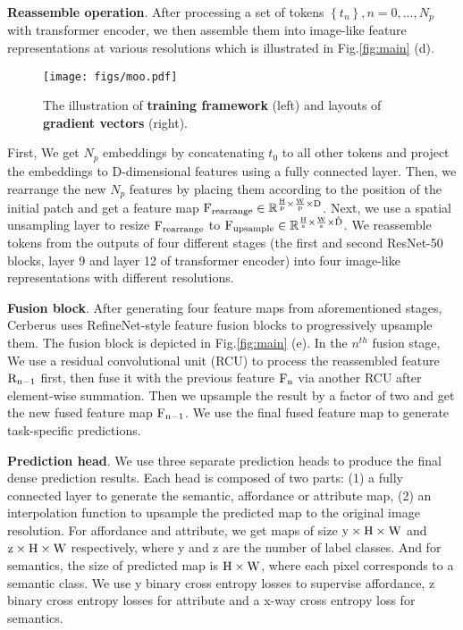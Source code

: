 \documentclass[10pt,twocolumn,letterpaper]{article}
\begin{document}
\textbf{Reassemble operation}. After processing a set of tokens $\left\{t_n\right\}, n=0,...,N_p$  with transformer encoder, we then assemble them into image-like feature representations at various resolutions which is illustrated in Fig.\ref{fig:main} (d). 

\begin{figure*}[t]
	\centering
	\texttt{[image: figs/moo.pdf]}
	\caption{The illustration of \textbf{training framework} (left) and layouts of \textbf{gradient vectors} (right). }
	\label{fig:moo} 
\end{figure*}

First, We get $N_p$ embeddings by concatenating $t_0$ to all other tokens and project the embeddings to D-dimensional features using a fully connected layer. Then, we rearrange the new $ N_p$ features by placing them according to the position of the initial patch and get a feature map $\rm F_{rearrange} \in \mathbb{R}^{\frac{H}{p} \times \frac{W}{p} \times D}$. Next, we use a spatial unsampling layer to resize $\rm F_{rearrange}$ to $\rm F_{upsample} \in \mathbb{R}^{\frac{H}{s} \times \frac{W}{s} \times \hat{D}}$. We reassemble tokens from the outputs of four different stages (the first and second ResNet-50 blocks, layer 9 and layer 12 of transformer encoder) into four image-like representations with different resolutions.

\textbf{Fusion block}. After generating four feature maps from aforementioned stages, Cerberus uses RefineNet-style\cite{lin2017refinenet} feature fusion blocks to progressively upsample them. The fusion block is depicted in Fig.\ref{fig:main} (e). In the $n^{th}$ fusion stage, We use a residual convolutional unit (RCU) to process the reassembled feature $\rm R_{n-1}$ first, then fuse it with the previous feature $\rm F_{n}$ via another RCU after element-wise summation. Then we upsample the result by a factor of two and get the new fused feature map $\rm F_{n-1}$. We use the final fused feature map to generate task-specific predictions.

\textbf{Prediction head}. 
We use three separate prediction heads to produce the final dense prediction results. Each head is composed of two parts: (1) a fully connected layer to generate the semantic, affordance or attribute map, (2) an interpolation function to upsample the predicted map to the original image resolution. For affordance and attribute, we get maps of size $ \rm y \times H \times W$ and  $ \rm z \times H \times W$ respectively, where y and z are the number of label classes. And for semantics, the size of predicted map is $\rm  H \times W$, where each pixel corresponds to a semantic class. We use y binary cross entropy losses to supervise affordance, z binary cross entropy losses for attribute and a x-way cross entropy loss for semantics.
\end{document}
